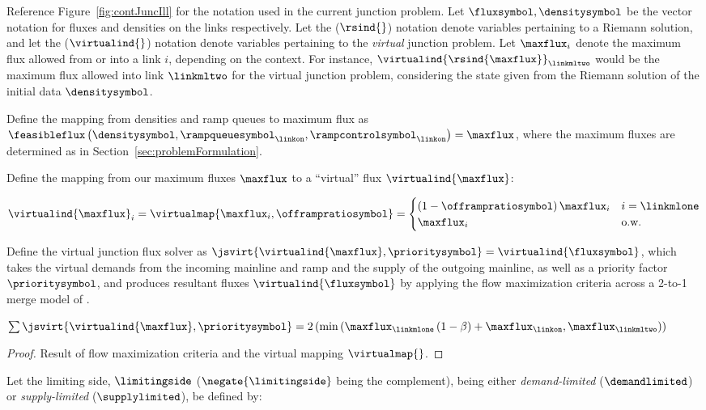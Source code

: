 
Reference Figure~\ref{fig:contJuncIll} for the notation used in the current junction problem. Let $\fluxsymbol, \densitysymbol$ be the vector notation for fluxes and densities on the links respectively. Let the ($\rsind{}$) notation denote variables pertaining to a Riemann solution, and let the ($\virtualind{}$) notation denote variables pertaining to the \emph{virtual} junction problem. Let $\maxflux_i$ denote the maximum flux allowed from or into a link $i$, depending on the context. For instance, $\virtualind{\rsind{\maxflux}}_{\linkmltwo}$ would be the maximum flux allowed into link $\linkmltwo$ for the virtual junction problem, considering the state given from the Riemann solution of the initial data $\densitysymbol$.

Define the mapping from densities and ramp queues to maximum flux as $\feasibleflux \left(\densitysymbol, \rampqueuesymbol_{\linkon}, \rampcontrolsymbol_{\linkon} \right) = \maxflux$, where the maximum fluxes are determined as in Section~\ref{sec:problemFormulation}.

Define the mapping from our maximum fluxes $\maxflux$ to a ``virtual''
flux $\virtualind{\maxflux}$:

\[
\virtualind{\maxflux}_{i}=\virtualmap{\maxflux_{i},\offrampratiosymbol}=\begin{cases}
\left(1-\offrampratiosymbol\right)\maxflux_{i} & i=\linkmlone\\
\maxflux_{i} & \text{o.w.}
\end{cases}
\]


Define the virtual junction flux solver as $\jsvirt{\virtualind{\maxflux},\prioritysymbol}=\virtualind{\fluxsymbol}$,
which takes the virtual demands from the incoming mainline and ramp
and the supply of the outgoing mainline, as well as a priority factor
$\prioritysymbol$, and produces resultant fluxes $\virtualind{\fluxsymbol}$
by applying the flow maximization criteria across a 2-to-1 merge model
of \cite{garavello2006traffic}. 
\begin{lem}
\label{lem:max-flow-js}$\sum\jsvirt{\virtualind{\maxflux},\prioritysymbol}=2\left(\min\left(\maxflux_{\linkmlone}\left(1-\beta\right)+\maxflux_{\linkon},\maxflux_{\linkmltwo}\right)\right)$\end{lem}
\begin{proof}
Result of flow maximization criteria and the virtual mapping $\virtualmap{}$.
\end{proof}
Let the limiting side, $\limitingside$ ($\negate{\limitingside}$
being the complement), being either \emph{demand-limited} ($\demandlimited$) or \emph{supply-limited} ($\supplylimited$), be defined
by:

